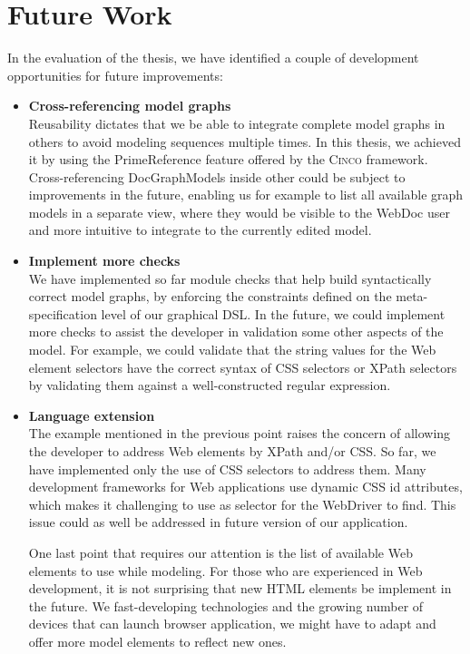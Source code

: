 \section{Future Work}\label{sec:futwork}

 In the evaluation of the thesis, we have identified a couple of development opportunities for future improvements:
\begin{itemize}
    \item \textbf{Cross-referencing model graphs}\\
        Reusability dictates that we be able to integrate complete model graphs in others to avoid modeling sequences multiple times. In this thesis, we achieved it by using the PrimeReference feature offered by the \textsc{Cinco} framework. Cross-referencing DocGraphModels inside other could be subject to improvements in the future, enabling us for example to list all available graph models in a separate view, where they would be visible to the WebDoc user and more intuitive to integrate to the currently edited model.
    \item \textbf{Implement more checks}\\
        We have implemented so far module checks that help build syntactically correct model graphs, by enforcing the constraints defined on the meta-specification level of our graphical DSL. In the future, we could implement more checks to assist the developer in validation some other aspects of the model. For example, we could validate that the string values for the Web element selectors have the correct syntax of CSS selectors or XPath selectors by validating them against a well-constructed regular expression.
    \item \textbf{Language extension}\\
        The example mentioned in the previous point raises the concern of allowing the developer to address Web elements by XPath and/or CSS. So far, we have implemented only the use of CSS selectors to address them. Many development frameworks for Web applications use dynamic CSS id attributes, which makes it challenging to use as selector for the WebDriver to find. This issue could as well be addressed in future version of our application.

        One last point that requires our attention is the list of available Web elements to use while modeling. For those who are experienced in Web development, it is not surprising that new HTML elements be implement in the future. We fast-developing technologies and the growing number of devices that can launch browser application, we might have to adapt and offer more model elements to reflect new ones.


\end{itemize}
